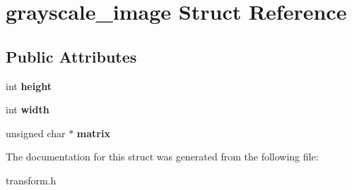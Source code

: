 \hypertarget{structgrayscale__image}{}\section{grayscale\+\_\+image Struct Reference}
\label{structgrayscale__image}
\subsection*{Public Attributes}
\begin{DoxyCompactItemize}
\item 
\mbox{\label{structgrayscale__image_a2993bc65aa6a7acd28e6f419baadfd67}} 
int {\bfseries height}
\item 
\mbox{\label{structgrayscale__image_aa3e10cbce907f52294577a410da7d7bf}} 
int {\bfseries width}
\item 
\mbox{\label{structgrayscale__image_aad0575c83e950ff107789aeb4e5a8548}} 
unsigned char $\ast$ {\bfseries matrix}
\end{DoxyCompactItemize}


The documentation for this struct was generated from the following file\+:\begin{DoxyCompactItemize}
\item 
transform.\+h\end{DoxyCompactItemize}
